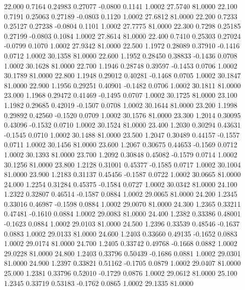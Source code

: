   22.000   0.7164   0.24983   0.27077  -0.0800   0.1141   1.0002  27.5740  81.0000
  22.100   0.7191   0.25063   0.27189  -0.0803   0.1120   1.0002  27.6812  81.0000
  22.200   0.7233   0.25127   0.27238  -0.0804   0.1101   1.0002  27.7775  81.0000
  22.300   0.7298   0.25185   0.27199  -0.0803   0.1084   1.0002  27.8614  81.0000
  22.400   0.7410   0.25303   0.27024  -0.0799   0.1070   1.0002  27.9342  81.0000
  22.500   1.1972   0.28089   0.37910  -0.1416   0.0712   1.0002  30.1358  81.0000
  22.600   1.1952   0.28450   0.38833  -0.1436   0.0708   1.0002  30.1628  81.0000
  22.700   1.1946   0.28748   0.39597  -0.1453   0.0706   1.0002  30.1789  81.0000
  22.800   1.1948   0.29012   0.40281  -0.1468   0.0705   1.0002  30.1847  81.0000
  22.900   1.1956   0.29251   0.40901  -0.1482   0.0706   1.0002  30.1811  81.0000
  23.000   1.1968   0.29472   0.41469  -0.1495   0.0707   1.0002  30.1725  81.0000
  23.100   1.1982   0.29685   0.42019  -0.1507   0.0708   1.0002  30.1644  81.0000
  23.200   1.1998   0.29892   0.42560  -0.1520   0.0709   1.0002  30.1576  81.0000
  23.300   1.2014   0.30095   0.43096  -0.1532   0.0710   1.0002  30.1524  81.0000
  23.400   1.2030   0.30294   0.43631  -0.1545   0.0710   1.0002  30.1488  81.0000
  23.500   1.2047   0.30489   0.44157  -0.1557   0.0711   1.0002  30.1456  81.0000
  23.600   1.2067   0.30675   0.44653  -0.1569   0.0712   1.0002  30.1393  81.0000
  23.700   1.2092   0.30848   0.45082  -0.1579   0.0714   1.0002  30.1256  81.0000
  23.800   1.2128   0.31001   0.45377  -0.1585   0.0717   1.0002  30.1004  81.0000
  23.900   1.2183   0.31137   0.45456  -0.1587   0.0722   1.0002  30.0665  81.0000
  24.000   1.2254   0.31284   0.45375  -0.1584   0.0727   1.0002  30.0342  81.0000
  24.100   1.2322   0.32807   0.46514  -0.1587   0.0884   1.0002  29.0065  81.0000
  24.200   1.2345   0.33016   0.46987  -0.1598   0.0884   1.0002  29.0070  81.0000
  24.300   1.2365   0.33211   0.47481  -0.1610   0.0884   1.0002  29.0083  81.0000
  24.400   1.2382   0.33386   0.48001  -0.1623   0.0884   1.0002  29.0103  81.0000
  24.500   1.2396   0.33539   0.48546  -0.1637   0.0883   1.0002  29.0133  81.0000
  24.600   1.2403   0.33660   0.49135  -0.1652   0.0883   1.0002  29.0174  81.0000
  24.700   1.2405   0.33742   0.49768  -0.1668   0.0882   1.0002  29.0228  81.0000
  24.800   1.2403   0.33796   0.50439  -0.1686   0.0881   1.0002  29.0301  81.0000
  24.900   1.2397   0.33821   0.51162  -0.1705   0.0879   1.0002  29.0407  81.0000
  25.000   1.2381   0.33796   0.52010  -0.1729   0.0876   1.0002  29.0612  81.0000
  25.100   1.2345   0.33719   0.53183  -0.1762   0.0865   1.0002  29.1335  81.0000
